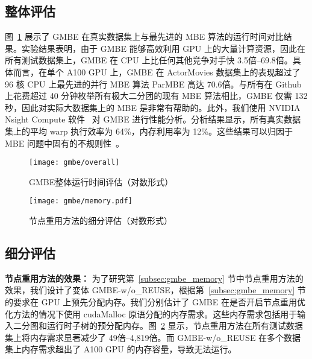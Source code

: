 \subsection{整体评估}

图~\ref{fig:gmbe_exp_overall} 展示了 GMBE 在真实数据集上与最先进的 MBE 算法的运行时间对比结果。实验结果表明，由于 GMBE 能够高效利用 GPU 上的大量计算资源，因此在所有测试数据集上，GMBE 在 CPU 上比任何其他竞争对手快 3.5倍--69.8倍。具体而言，在单个 A100 GPU 上，GMBE 在 ActorMovies 数据集上的表现超过了 96 核 CPU 上最先进的并行 MBE 算法 ParMBE 高达 70.6倍。与所有在 Github 上花费超过 40 分钟枚举所有极大二分团的现有 MBE 算法相比，GMBE 仅需 132 秒，因此对实际大数据集上的 MBE 是非常有帮助的。此外，我们使用 NVIDIA Nsight Compute 软件~\cite{Nsight} 对 GMBE 进行性能分析。分析结果显示，所有真实数据集上的平均 warp 执行效率为 64\%，内存利用率为 12\%。这些结果可以归因于 MBE 问题中固有的不规则性~\cite{Irregularity12}。

\begin{figure} [t]
  \center
		\texttt{[image: gmbe/overall]}
	\caption{GMBE整体运行时间评估（对数形式）}
	\label{fig:gmbe_exp_overall}
\end{figure}


\begin{figure} [t]
	\centering
  \vspace{0.05in}
	\texttt{[image: gmbe/memory.pdf]}	
	\vspace{0.05in}
  \caption{节点重用方法的细分评估（对数形式）}
	\label{fig:gmbe_exp_memory}
\end{figure}




\subsection{细分评估}
\label{subsec:gmbe_breakdown}


\textbf{节点重用方法的效果：} 为了研究第~\ref{subsec:gmbe_memory} 节中节点重用方法的效果，我们设计了变体 GMBE-w/o\_REUSE，根据第~\ref{subsec:gmbe_memory} 节的要求在 GPU 上预先分配内存。我们分别估计了 GMBE 在是否开启节点重用优化方法的情况下使用 \textsf{cudaMalloc} 原语分配的内存需求。这些内存需求包括用于输入二分图和运行时子树的预分配内存。图~\ref{fig:gmbe_exp_memory} 显示，节点重用方法在所有测试数据集上将内存需求显著减少了 49倍--4,819倍。而 GMBE-w/o\_REUSE 在多个数据集上内存需求超出了 A100 GPU 的内存容量，导致无法运行。




